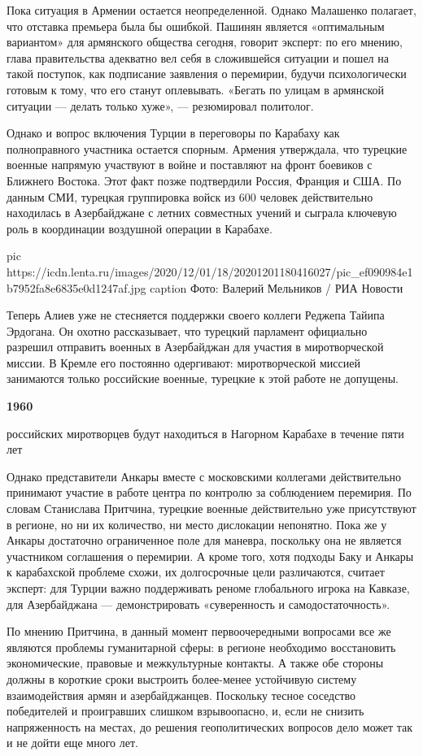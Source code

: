 Пока ситуация в Армении остается неопределенной. Однако Малашенко полагает, что
отставка премьера была бы ошибкой. Пашинян является «оптимальным вариантом» для
армянского общества сегодня, говорит эксперт: по его мнению, глава
правительства адекватно вел себя в сложившейся ситуации и пошел на такой
поступок, как подписание заявления о перемирии, будучи психологически готовым к
тому, что его станут оплевывать. «Бегать по улицам в армянской ситуации —
делать только хуже», — резюмировал политолог.

Однако и вопрос включения Турции в переговоры по Карабаху как полноправного
участника остается спорным. Армения утверждала, что турецкие военные напрямую
участвуют в войне и поставляют на фронт боевиков с Ближнего Востока. Этот факт
позже подтвердили Россия, Франция и США. По данным СМИ, турецкая группировка
войск из 600 человек действительно находилась в Азербайджане с летних
совместных учений и сыграла ключевую роль в координации воздушной операции в
Карабахе.

\ifcmt
pic https://icdn.lenta.ru/images/2020/12/01/18/20201201180416027/pic_ef090984e1b7952fa8e6835e0d1247af.jpg
caption Фото: Валерий Мельников / РИА Новости
\fi

Теперь Алиев уже не стесняется поддержки своего коллеги Реджепа Тайипа
Эрдогана. Он охотно рассказывает, что турецкий парламент официально разрешил
отправить военных в Азербайджан для участия в миротворческой миссии. В Кремле
его постоянно одергивают: миротворческой миссией занимаются только российские
военные, турецкие к этой работе не допущены.

\begin{leftbar}
	\bfseries
{\Huge\centering\color{orange} 1960}\par
российских миротворцев будут находиться в Нагорном Карабахе в течение пяти лет
\end{leftbar}

Однако представители Анкары вместе с московскими коллегами действительно
принимают участие в работе центра по контролю за соблюдением перемирия. По
словам Станислава Притчина, турецкие военные действительно уже присутствуют в
регионе, но ни их количество, ни место дислокации непонятно. Пока же у Анкары
достаточно ограниченное поле для маневра, поскольку она не является участником
соглашения о перемирии. А кроме того, хотя подходы Баку и Анкары к карабахской
проблеме схожи, их долгосрочные цели различаются, считает эксперт: для Турции
важно поддерживать реноме глобального игрока на Кавказе, для Азербайджана —
демонстрировать «суверенность и самодостаточность».

По мнению Притчина, в данный момент первоочередными вопросами все же являются
проблемы гуманитарной сферы: в регионе необходимо восстановить экономические,
правовые и межкультурные контакты. А также обе стороны должны в короткие сроки
выстроить более-менее устойчивую систему взаимодействия армян и азербайджанцев.
Поскольку тесное соседство победителей и проигравших слишком взрывоопасно, и,
если не снизить напряженность на местах, до решения геополитических вопросов
дело может так и не дойти еще много лет.
